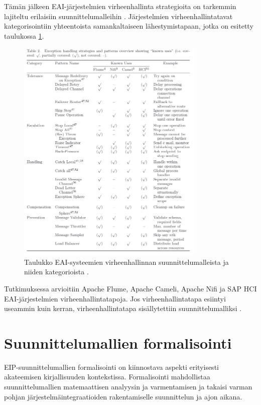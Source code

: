 Tämän jälkeen EAI-järjestelmien virheenhallinta strategioita on tarkemmin lajiteltu erilaisiin suunnittelumalleihin \citep{ExceptionRitter2016}. Järjestelmien virheenhallintatavat kategorisointiin yhteentoista samankaltaiseen lähestymistapaan, jotka on esitetty taulukossa \ref{fig:exceptionritter}.


\begin{figure}[h]
\begin{center}
\includegraphics[width=0.8\textwidth]{kuvat/ritter_expetions.png}
\caption{Taulukko EAI-systeemien virheenhallinnan suunnittelumalleista ja niiden kategorioista \citep{ExceptionRitter2016}.\label{fig:exceptionritter}}
\end{center}
\end{figure}


Tutkimuksessa arvioitiin Apache Flume, Apache Cameli, Apache Nifi ja SAP HCI EAI-järjestelmien virheenhallintatapoja. Jos virheenhallintatapa esiintyi useammin kuin kerran, virheenhallintatapa sisällytettiin suunnittelumalliksi \citep{ExceptionRitter2016}.



\section{Suunnittelumallien formalisointi} \label{section:formalisointi}
EIP-suunnittelumallien formalisointi on kiinnostava aspekti erityisesti akateemisen kirjallisuuden kontekstissa. Formalisointi mahdollistaa suunnittelumallien matemaattisen analyysin ja varmentamisen ja takaisi varman pohjan järjestelmäintegraatioiden rakentamiselle suunnittelun ja ajon aikana.

